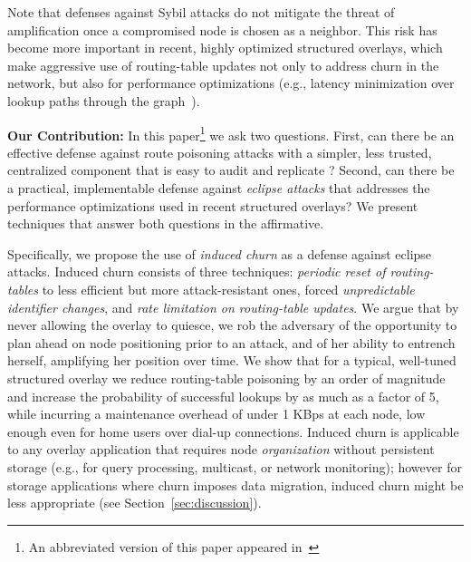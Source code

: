 \documentclass[10pt,twocolumn]{article}
\renewcommand{\paragraph}[1]{\textbf{#1:}}
\begin{document}
Note that defenses against Sybil attacks do not mitigate the threat of
amplification once a compromised node is chosen as a neighbor.  This
risk has become more important in recent, highly optimized structured overlays,
which make aggressive use of routing-table updates not only to address
churn in the network,
but also for performance optimizations (e.g., latency
minimization over lookup paths through the graph~\cite{Gummadi2003b,Rhea2004}).

\paragraph{Our Contribution}
In this paper\footnote{An abbreviated version of this paper appeared in~\cite{Maelstrom2005}} we ask two questions.  First, can there be an
effective defense against route poisoning attacks with a simpler, less trusted,
 centralized component that is easy to audit and replicate ?  Second, can
there be a practical, implementable defense against \emph{eclipse attacks} that
addresses the performance optimizations used in recent structured overlays?  We
present techniques that answer both questions in the affirmative.

Specifically, we propose the use of \emph{induced churn}
as a defense against eclipse attacks.  Induced churn consists of three
techniques: \emph{periodic reset of routing-tables} to less efficient but more
attack-resistant ones,  forced \emph{unpredictable identifier changes},
and \emph{rate limitation on routing-table updates}.  We argue that by never allowing the overlay to
quiesce, we rob the adversary of the opportunity to plan ahead on node
positioning prior to an attack, and of her
ability to entrench herself, amplifying her position over time.
We show that for a typical, well-tuned structured overlay we reduce
routing-table poisoning by an order of magnitude and increase the
probability of successful lookups by as much as a factor
of 5, while incurring a maintenance overhead of under 1 KBps at each
node, low enough even for home users over dial-up connections.
Induced churn is applicable to any overlay application
that requires node \emph{organization} without persistent storage (e.g., for
query processing, multicast, or network monitoring); however for storage applications where churn
imposes data migration, induced churn
might be less appropriate (see Section~\ref{sec:discussion}).
\end{document}
